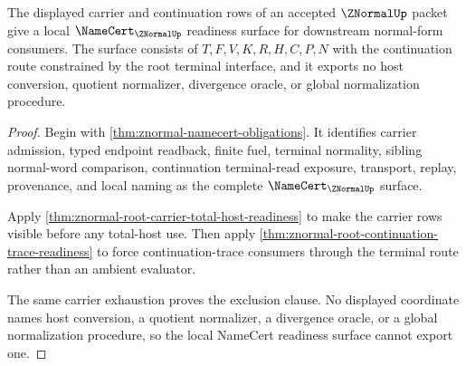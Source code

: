 \begin{theorem}
\label{thm:znormal-root-namecert-readiness}
The displayed carrier and continuation rows of an accepted $\ZNormalUp$ packet give a local $\NameCert_{\ZNormalUp}$ readiness surface for downstream normal-form consumers. The surface consists of $T,F,V,K,R,H,C,P,N$ with the continuation route constrained by the root terminal interface, and it exports no host conversion, quotient normalizer, divergence oracle, or global normalization procedure.
\end{theorem}
\begin{proof}
Begin with \autoref{thm:znormal-namecert-obligations}. It identifies carrier admission, typed endpoint readback, finite fuel, terminal normality, sibling normal-word comparison, continuation terminal-read exposure, transport, replay, provenance, and local naming as the complete $\NameCert_{\ZNormalUp}$ surface.

Apply \autoref{thm:znormal-root-carrier-total-host-readiness} to make the carrier rows visible before any total-host use. Then apply \autoref{thm:znormal-root-continuation-trace-readiness} to force continuation-trace consumers through the terminal route rather than an ambient evaluator.

The same carrier exhaustion proves the exclusion clause. No displayed coordinate names host conversion, a quotient normalizer, a divergence oracle, or a global normalization procedure, so the local NameCert readiness surface cannot export one.
\end{proof}

